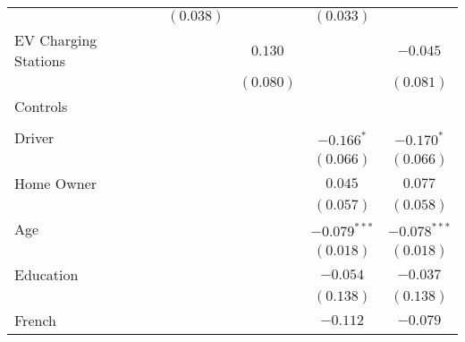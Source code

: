 \begin{center}
\begin{tiny}
\begin{longtable}{l@{} c@{} c@{} c@{} c@{} c@{}}
                                                      &                  & $(0.038)$        &                  & $(0.033)$        &                  \\
\quad EV Charging Stations                            &                  &                  & $0.130$          &                  & $-0.045$         \\
                                                      &                  &                  & $(0.080)$        &                  & $(0.081)$        \\
Controls                                              &                  &                  &                  &                  &                  \\
                                                      &                  &                  &                  &                  &                  \\
\quad Driver                                          &                  &                  &                  & $-0.166^{*}$     & $-0.170^{*}$     \\
                                                      &                  &                  &                  & $(0.066)$        & $(0.066)$        \\
\quad Home Owner                                      &                  &                  &                  & $0.045$          & $0.077$          \\
                                                      &                  &                  &                  & $(0.057)$        & $(0.058)$        \\
\quad Age                                             &                  &                  &                  & $-0.079^{***}$   & $-0.078^{***}$   \\
                                                      &                  &                  &                  & $(0.018)$        & $(0.018)$        \\
\quad Education                                       &                  &                  &                  & $-0.054$         & $-0.037$         \\
                                                      &                  &                  &                  & $(0.138)$        & $(0.138)$        \\
\quad French                                          &                  &                  &                  & $-0.112$         & $-0.079$         \\

\end{longtable}
\end{tiny}
\end{center}
